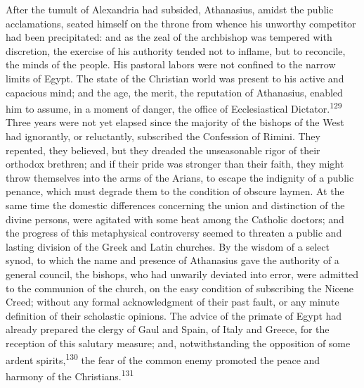 

After the tumult of Alexandria had subsided, Athanasius, amidst
the public acclamations, seated himself on the throne from whence
his unworthy competitor had been precipitated: and as the zeal of
the archbishop was tempered with discretion, the exercise of his
authority tended not to inflame, but to reconcile, the minds of
the people. His pastoral labors were not confined to the narrow
limits of Egypt. The state of the Christian world was present to
his active and capacious mind; and the age, the merit, the
reputation of Athanasius, enabled him to assume, in a moment of
danger, the office of Ecclesiastical Dictator.\textsuperscript{129} Three years
were not yet elapsed since the majority of the bishops of the
West had ignorantly, or reluctantly, subscribed the Confession of
Rimini. They repented, they believed, but they dreaded the
unseasonable rigor of their orthodox brethren; and if their pride
was stronger than their faith, they might throw themselves into
the arms of the Arians, to escape the indignity of a public
penance, which must degrade them to the condition of obscure
laymen. At the same time the domestic differences concerning the
union and distinction of the divine persons, were agitated with
some heat among the Catholic doctors; and the progress of this
metaphysical controversy seemed to threaten a public and lasting
division of the Greek and Latin churches. By the wisdom of a
select synod, to which the name and presence of Athanasius gave
the authority of a general council, the bishops, who had unwarily
deviated into error, were admitted to the communion of the
church, on the easy condition of subscribing the Nicene Creed;
without any formal acknowledgment of their past fault, or any
minute definition of their scholastic opinions. The advice of the
primate of Egypt had already prepared the clergy of Gaul and
Spain, of Italy and Greece, for the reception of this salutary
measure; and, notwithstanding the opposition of some ardent
spirits,\textsuperscript{130} the fear of the common enemy promoted the peace and
harmony of the Christians.\textsuperscript{131}


